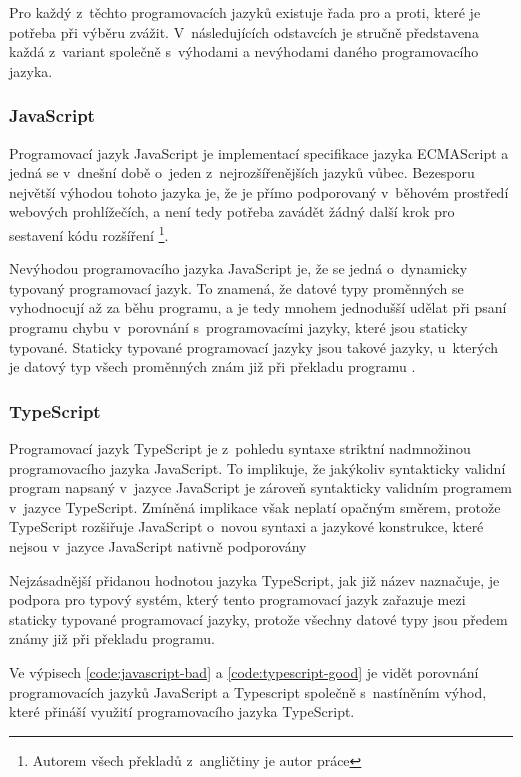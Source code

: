 Pro každý z~těchto programovacích jazyků existuje řada pro a proti, které je potřeba při výběru zvážit. V~následujících odstavcích je stručně představena každá z~variant společně s~výhodami a nevýhodami daného programovacího jazyka.

\subsubsection{JavaScript}

 Programovací jazyk JavaScript je implementací specifikace jazyka ECMAScript a jedná se v~dnešní době o~jeden z~nejrozšířenějších jazyků vůbec. Bezesporu největší výhodou tohoto jazyka je, že je přímo podporovaný v~běhovém prostředí webových prohlížečích, a není tedy potřeba zavádět žádný další krok pro sestavení kódu rozšíření \cite[kap. 1]{flanagan_javascript_2020}\footnote{Autorem všech překladů z~angličtiny je autor práce}. 
 
 Nevýhodou programovacího jazyka JavaScript je, že se jedná o~dynamicky typovaný programovací jazyk. To znamená, že datové typy proměnných se vyhodnocují až za běhu programu, a je tedy mnohem jednodušší udělat při psaní programu chybu v~porovnání s~programovacími jazyky, které jsou staticky typované. Staticky typované programovací jazyky jsou takové jazyky, u~kterých je datový typ všech proměnných znám již při překladu programu \cite[kap. 3.1]{flanagan_javascript_2020}.

\subsubsection{TypeScript}

Programovací jazyk TypeScript je z~pohledu syntaxe striktní nadmnožinou programovacího jazyka JavaScript. 
To implikuje, že jakýkoliv syntakticky validní program napsaný v~jazyce JavaScript je zároveň syntakticky validním programem v~jazyce TypeScript. Zmíněná implikace však neplatí opačným směrem, protože TypeScript rozšiřuje JavaScript o~novou syntaxi a jazykové konstrukce, které nejsou v~jazyce JavaScript nativně podporovány \cite{cherny_programming_2019}

Nejzásadnější přidanou hodnotou jazyka TypeScript, jak již název naznačuje, je podpora pro typový systém, který tento programovací jazyk zařazuje mezi staticky typované programovací jazyky, protože všechny datové typy jsou předem známy již při překladu programu. 

Ve výpisech \ref{code:javascript-bad} a \ref{code:typescript-good} je vidět porovnání programovacích jazyků JavaScript a Typescript společně s~nastíněním výhod, které přináší využití programovacího jazyka TypeScript.

